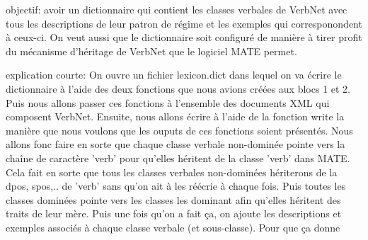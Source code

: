 objectif: avoir un dictionnaire qui contient les classes verbales de VerbNet avec tous les descriptions de leur patron de régime  et les exemples qui corresponondent à ceux-ci. On veut aussi que le dictionnaire soit configuré de manière à tirer profit du mécanisme d'héritage de VerbNet que le logiciel MATE permet.

explication courte: On ouvre un fichier lexicon.dict dans lequel on va écrire le dictionnaire à l'aide des deux fonctions que nous avions créées aux blocs 1 et 2. Puis nous allons passer ces fonctions à l'ensemble des documents XML qui composent VerbNet. Ensuite, nous allons écrire à l'aide de la fonction write la manière que nous voulons que les ouputs de ces fonctions soient présentés. Nous allons fonc faire en sorte que chaque classe verbale non-dominée pointe vers la chaîne de caractère 'verb' pour qu'elles héritent de la classe 'verb' dans MATE. Cela fait en sorte que tous les classes verbales non-dominées hériterons de la dpos, spos,.. de 'verb' sans qu'on ait à les réécrie à chaque fois. Puis toutes les classes dominées pointe vers les classes les dominant afin qu'elles héritent des traits de leur mère. Puis une fois qu'on a fait ça, on ajoute les descriptions et exemples associés à chaque classe verbale (et sous-classe). Pour que ça donne 


